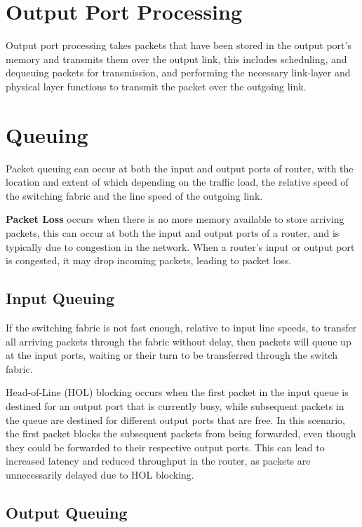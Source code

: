 \documentclass[12pt letter]{report}
\begin{document}
\section{Output Port Processing}

Output port processing takes packets that have been stored in the
output port's memory and transmits them over the output link, this
includes scheduling, and dequeuing packets for transmission, and
performing the necessary link-layer and physical layer functions to
transmit the packet over the outgoing link.

\section{Queuing}

Packet queuing can occur at both the input and output ports of
router, with the location and extent of which depending on the
traffic load, the relative speed of the switching fabric and the line
speed of the outgoing link.

\textbf{Packet Loss} occurs when there is no more memory available to
store arriving packets, this can occur at both the input and output
ports of a router, and is typically due to congestion in the network.
When a router's input or output port is congested, it may drop
incoming packets, leading to packet loss.

\subsection{Input Queuing}

If the switching fabric is not fast enough, relative to input line
speeds, to transfer all arriving packets through the fabric without
delay, then packets will queue up at the input ports, waiting or
their turn to be transferred through the switch fabric.

Head-of-Line (HOL) blocking occurs when the first packet in the input
queue is destined for an output port that is currently busy, while subsequent
packets in the queue are destined for different output ports that are
free. In this scenario, the first packet blocks the subsequent
packets from being forwarded, even though they could be forwarded to
their respective output ports. This can lead to increased latency and
reduced throughput in the router, as packets are unnecessarily
delayed due to HOL blocking.

\subsection{Output Queuing}
\end{document}

